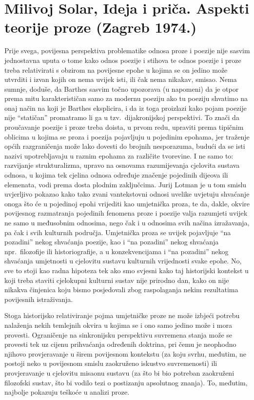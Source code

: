 \documentclass[a4paper,12pt,twoside]{report}
\begin{document}
\chapter[Milivoj Solar, Ideja i priča]{Milivoj Solar, Ideja i priča. Aspekti teorije proze  (Zagreb 1974.)}

Prije svega, povijesna perspektiva problematike odnosa proze i poezije nije sasvim jednostavna uputa o tome kako odnos poezije i stihova te odnos poezije i proze treba relativirati s obzirom na povijesne epohe u kojima se on jedino može utvrditi i izvan kojih on nema uvijek isti, ili čak nema nikakav, smisao. Nema sumnje, doduše, da Barthes sasvim točno upozorava (u napomeni) da je otpor prema mitu karakterističan samo za modernu poeziju ako tu poeziju shvatimo na onaj način na koji je Barthes eksplicira, i da iz toga proizlazi kako pojam poezije nije ``statičan'' promatramo li ga u tzv.\ dijakronijskoj perspektivi. To znači da proučavanje poezije i proze treba doista, u prvom redu, upraviti prema tipičnim oblicima u kojima se proza i poezija pojavljuju u pojedinim epohama, jer traženje općih razgraničenja može lako dovesti do brojnih nesporazuma, budući da se isti nazivi upotrebljavaju u raznim epohama za različite tvorevine. I ne samo to: razvijanje strukturalizma, upravo na osnovama razumijevanja cjelovita sustava odnosa, u kojima tek cjelina odnosa određuje značenje pojedinih dijeova ili elemenata, vodi prema dosta plodnim zaključcima. Jurij Lotman je u tom smislu uvjerljivo pokazao kako tako zvani vantekstovni odnosi uvelike uvjetuju shvaćanje onoga što će u pojedinoj epohi vrijediti kao umjetnička proza, te da, dakle, okvire povijesnog razmatranja pojedinih fenomena proze i poezije valja razumjeti uvijek ne samo u međusobnim odnosima, nego čak i u odnosima svih načina izražavanja, pa čak i svih kulturnih područja. Umjetnička proza se uvijek pojavljuje ``na pozadini'' nekog shvaćanja poezije, kao i ``na pozadini'' nekog shvaćanja npr.\ filozofije ili historiografije, a u konzekvencijama i ``na pozadini'' nekog shvaćanja umjetnosti u cjelovitu sustavu kulturnih vrijednosti svake epohe. No, sve to stoji kao radna hipoteza tek ako smo svjesni kako taj historijski kontekst u koji treba staviti cjelokupni kulturni sustav nije prirodno dan, kako on nije nikakva činjenica koju bismo posjedovali zbog raspolaganja nekim rezultatima povijesnih istraživanja.

Stoga historijsko relativiranje pojma umjetničke proze ne može izbjeći potrebu nalaženja nekih temlejnih okvira u kojima se i ono samo jedino može i mora provesti. Ograničenje na sinkronijsku perspektivu suvremena stanja može se provesti tek uz cijenu prihvaćanja određenih doktrina, pri čemu je neophodno njihovo provjeravanje u širem povijesnom kontekstu (za koju svrhu, međutim, ne postoji neko u povijesnom smislu zaokruženo iskustvo suvremenosti) ili provjeravanje u cjelovitu misaonu sustavu (za što bi bio potreban zaokruženi filozofski sustav, što bi vodilo tezi o postizanju apsolutnog znanja). To, međutim, najbolje pokazuju teškoće u analizi proze.
\end{document}
